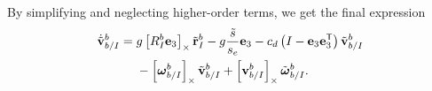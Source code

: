 
By simplifying and neglecting higher-order terms, we get the final expression
\begin{equation}
  \begin{split}
  \dot{\tilde{\boldsymbol{\mathrm{v}}}}_{b/I}^{b} = {}& g
  \left[ R_I^b \boldsymbol{\mathrm{e}}_3 \right]_{\times} \tilde{\boldsymbol{\mathrm{r}}}_I^b
    -g\frac{\tilde{s}}{s_e}\boldsymbol{\mathrm{e}}_3
   -c_d \left( I - \boldsymbol{\mathrm{e}}_3 \boldsymbol{\mathrm{e}}_3^{\mathsf{T}} \right)
    \tilde{\boldsymbol{\mathrm{v}}}_{b/I}^b \\
    &- \left[ \boldsymbol{\mathrm{\omega}}_{b/I}^b \right]_{\times} \tilde{\boldsymbol{\mathrm{v}}}_{b/I}^b +
    \left[ \boldsymbol{\mathrm{v}}_{b/I}^b \right]_{\times} \tilde{\boldsymbol{\mathrm{\omega}}}_{b/I}^b.
  \end{split}
\end{equation}


